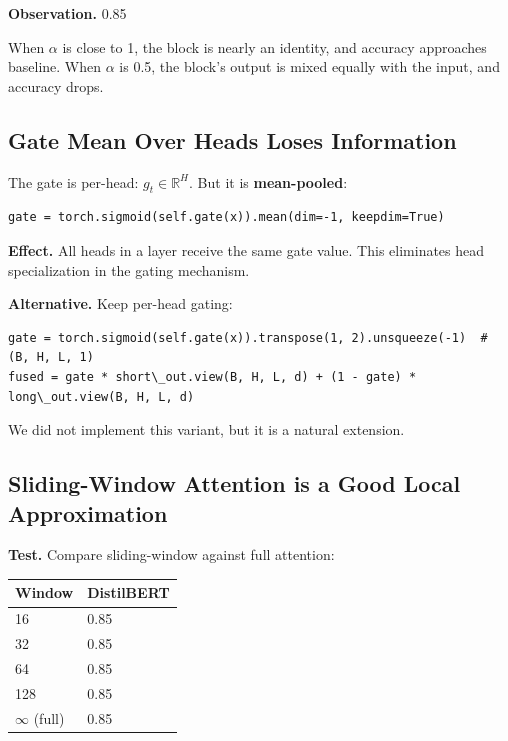 \textbf{Observation.} 0.85

When $\alpha$ is close to 1, the block is nearly an identity, and accuracy 
approaches baseline. When $\alpha$ is 0.5, the block's output is mixed equally 
with the input, and accuracy drops.

\subsection{Gate Mean Over Heads Loses Information}

The gate is per-head: $g_t \in \mathbb{R}^H$. But it is \textbf{mean-pooled}:

\begin{lstlisting}
gate = torch.sigmoid(self.gate(x)).mean(dim=-1, keepdim=True)
\end{lstlisting}

\textbf{Effect.} All heads in a layer receive the same gate value. This 
eliminates head specialization in the gating mechanism.

\textbf{Alternative.} Keep per-head gating:

\begin{lstlisting}
gate = torch.sigmoid(self.gate(x)).transpose(1, 2).unsqueeze(-1)  # (B, H, L, 1)
fused = gate * short\_out.view(B, H, L, d) + (1 - gate) * long\_out.view(B, H, L, d)
\end{lstlisting}

We did not implement this variant, but it is a natural extension.

\subsection{Sliding-Window Attention is a Good Local Approximation}

\textbf{Test.} Compare sliding-window against full attention:

\begin{table}[H]
\centering
\small
\begin{tabular}{ll}
\toprule
\textbf{Window} & \textbf{DistilBERT} \\
\midrule
16 & 0.85 \\
32 & 0.85 \\
64 & 0.85 \\
128 & 0.85 \\
$\infty$ (full) & 0.85 \\
\bottomrule
\end{tabular}
\end{table}

